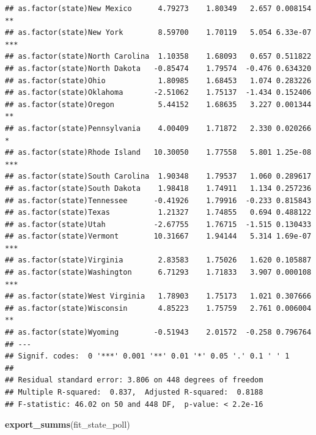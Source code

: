 \documentclass[
]{article}
\newenvironment{Shaded}{\begin{snugshade}}{\end{snugshade}}
\newcommand{\KeywordTok}[1]{\textcolor[rgb]{0.13,0.29,0.53}{\textbf{#1}}}
\newcommand{\NormalTok}[1]{#1}
\begin{document}
\begin{verbatim}
## as.factor(state)New Mexico      4.79273    1.80349   2.657 0.008154 ** 
## as.factor(state)New York        8.59700    1.70119   5.054 6.33e-07 ***
## as.factor(state)North Carolina  1.10358    1.68093   0.657 0.511822    
## as.factor(state)North Dakota   -0.85474    1.79574  -0.476 0.634320    
## as.factor(state)Ohio            1.80985    1.68453   1.074 0.283226    
## as.factor(state)Oklahoma       -2.51062    1.75137  -1.434 0.152406    
## as.factor(state)Oregon          5.44152    1.68635   3.227 0.001344 ** 
## as.factor(state)Pennsylvania    4.00409    1.71872   2.330 0.020266 *  
## as.factor(state)Rhode Island   10.30050    1.77558   5.801 1.25e-08 ***
## as.factor(state)South Carolina  1.90348    1.79537   1.060 0.289617    
## as.factor(state)South Dakota    1.98418    1.74911   1.134 0.257236    
## as.factor(state)Tennessee      -0.41926    1.79916  -0.233 0.815843    
## as.factor(state)Texas           1.21327    1.74855   0.694 0.488122    
## as.factor(state)Utah           -2.67755    1.76715  -1.515 0.130433    
## as.factor(state)Vermont        10.31667    1.94144   5.314 1.69e-07 ***
## as.factor(state)Virginia        2.83583    1.75026   1.620 0.105887    
## as.factor(state)Washington      6.71293    1.71833   3.907 0.000108 ***
## as.factor(state)West Virginia   1.78903    1.75173   1.021 0.307666    
## as.factor(state)Wisconsin       4.85223    1.75759   2.761 0.006004 ** 
## as.factor(state)Wyoming        -0.51943    2.01572  -0.258 0.796764    
## ---
## Signif. codes:  0 '***' 0.001 '**' 0.01 '*' 0.05 '.' 0.1 ' ' 1
## 
## Residual standard error: 3.806 on 448 degrees of freedom
## Multiple R-squared:  0.837,  Adjusted R-squared:  0.8188 
## F-statistic: 46.02 on 50 and 448 DF,  p-value: < 2.2e-16
\end{verbatim}

\begin{Shaded}
\begin{Highlighting}[]
\KeywordTok{export_summs}\NormalTok{(fit_state_poll)}
\end{Highlighting}
\end{Shaded}

 
  \providecommand{\huxb}[2]{\arrayrulecolor[RGB]{#1}\global\arrayrulewidth=#2pt}
  \providecommand{\huxvb}[2]{\color[RGB]{#1}\vrule width #2pt}
  \providecommand{\huxtpad}[1]{\rule{0pt}{#1}}
  \providecommand{\huxbpad}[1]{\rule[-#1]{0pt}{#1}}
\end{document}
